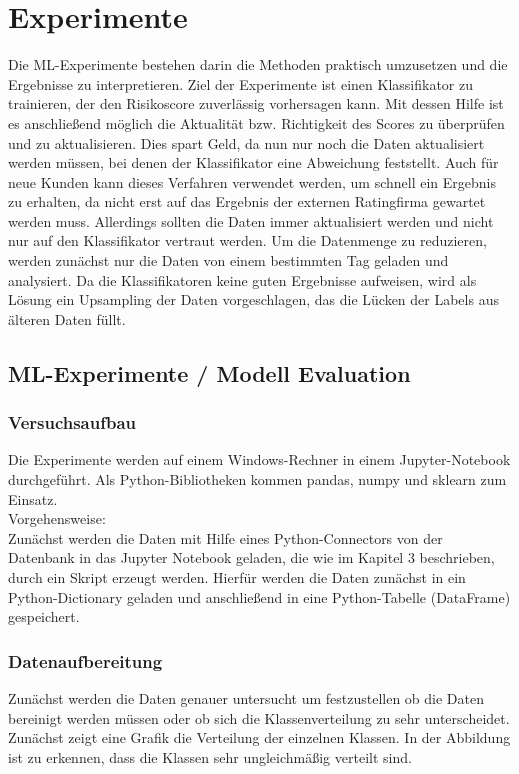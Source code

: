 \chapter{Experimente}\label{ch:experiments}
Die ML-Experimente bestehen darin die Methoden praktisch umzusetzen und die Ergebnisse zu interpretieren. 
Ziel der Experimente ist einen Klassifikator zu trainieren, der den Risikoscore zuverlässig vorhersagen kann. 
Mit dessen Hilfe ist es anschließend möglich die Aktualität bzw. Richtigkeit des Scores zu überprüfen und zu aktualisieren.
Dies spart Geld, da nun nur noch die Daten aktualisiert werden müssen, bei denen der Klassifikator eine Abweichung feststellt. 
Auch für neue Kunden kann dieses Verfahren verwendet werden, um schnell ein Ergebnis zu erhalten, da nicht erst auf das Ergebnis der externen Ratingfirma gewartet werden muss.
Allerdings sollten die Daten immer aktualisiert werden und nicht nur auf den Klassifikator vertraut werden. 
Um die Datenmenge zu reduzieren, werden zunächst nur die Daten von einem bestimmten Tag geladen und analysiert.
Da die Klassifikatoren keine guten Ergebnisse aufweisen, wird als Lösung ein Upsampling der Daten vorgeschlagen, das die Lücken der Labels aus älteren Daten füllt.


\section{ML-Experimente / Modell Evaluation }

\subsection{Versuchsaufbau}
Die Experimente werden auf einem Windows-Rechner in einem Jupyter-Notebook durchgeführt. 
Als Python-Bibliotheken kommen pandas, numpy und sklearn zum Einsatz. 
\\
Vorgehensweise: \\


Zunächst werden die Daten mit Hilfe eines Python-Connectors von der Datenbank in das Jupyter Notebook geladen, die wie im Kapitel 3 beschrieben, durch ein Skript erzeugt werden.
Hierfür werden die Daten zunächst in ein Python-Dictionary geladen und anschließend in eine Python-Tabelle (DataFrame) gespeichert. 

\subsection{Datenaufbereitung }
Zunächst werden die Daten genauer untersucht um festzustellen ob die Daten bereinigt werden müssen oder ob sich die Klassenverteilung zu sehr unterscheidet. 
Zunächst zeigt eine Grafik die Verteilung der einzelnen Klassen. 
In der Abbildung ist zu erkennen, dass die Klassen sehr ungleichmäßig
verteilt sind.

